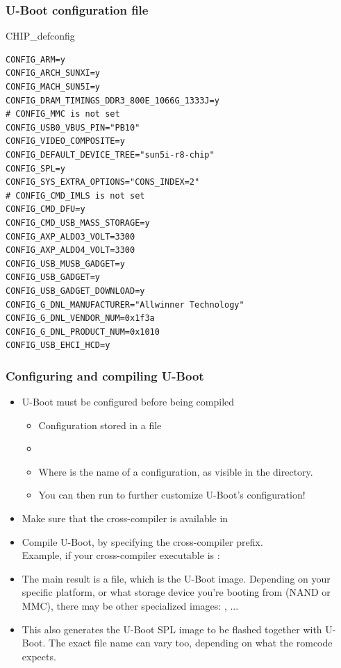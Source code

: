 \begin{frame}[fragile]
  \frametitle{U-Boot configuration file}
\begin{block}{CHIP\_defconfig}
{\tiny
\begin{verbatim}
CONFIG_ARM=y
CONFIG_ARCH_SUNXI=y
CONFIG_MACH_SUN5I=y
CONFIG_DRAM_TIMINGS_DDR3_800E_1066G_1333J=y
# CONFIG_MMC is not set
CONFIG_USB0_VBUS_PIN="PB10"
CONFIG_VIDEO_COMPOSITE=y
CONFIG_DEFAULT_DEVICE_TREE="sun5i-r8-chip"
CONFIG_SPL=y
CONFIG_SYS_EXTRA_OPTIONS="CONS_INDEX=2"
# CONFIG_CMD_IMLS is not set
CONFIG_CMD_DFU=y
CONFIG_CMD_USB_MASS_STORAGE=y
CONFIG_AXP_ALDO3_VOLT=3300
CONFIG_AXP_ALDO4_VOLT=3300
CONFIG_USB_MUSB_GADGET=y
CONFIG_USB_GADGET=y
CONFIG_USB_GADGET_DOWNLOAD=y
CONFIG_G_DNL_MANUFACTURER="Allwinner Technology"
CONFIG_G_DNL_VENDOR_NUM=0x1f3a
CONFIG_G_DNL_PRODUCT_NUM=0x1010
CONFIG_USB_EHCI_HCD=y
\end{verbatim}}
\end{block}
\end{frame}

\begin{frame}
  \frametitle{Configuring and compiling U-Boot}
  \begin{itemize}
  \item U-Boot must be configured before being compiled
    \begin{itemize}
    \item Configuration stored in a  file
    \item {}
    \item Where  is the name of a configuration, as
      visible in the  directory.
    \item You can then run  to further customize
      U-Boot's configuration!
    \end{itemize}
  \item Make sure that the cross-compiler is available in 
  \item Compile U-Boot, by specifying the cross-compiler prefix.\\
    Example, if your cross-compiler executable is :\\
  \item The main result is a  file, which is the
    U-Boot image. Depending on your specific platform, or what storage
    device you're booting from (NAND or MMC), there may be
    other specialized images: , ...
  \item This also generates the U-Boot SPL image to be flashed
    together with U-Boot. The exact file name can vary too, depending
    on what the romcode expects.
  \end{itemize}
\end{frame}

